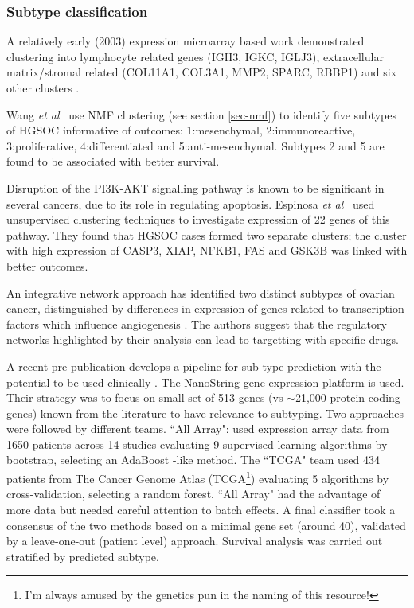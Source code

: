 \documentclass[tikz, 11pt,a4paper,oneside,fleqn]{article}
\newcommand{\etal}{{\em et al\/}}
\begin{document}
\subsubsection{Subtype classification}
\label{sec-subtype-classification}

A relatively early (2003) expression microarray based work demonstrated clustering into lymphocyte related genes (IGH3, IGKC, IGLJ3), extracellular matrix/stromal related (COL11A1, COL3A1, MMP2, SPARC, RBBP1) and six other clusters \cite{Schaner2003}.

Wang \etal\ \cite{Wang2017c} use NMF clustering (see section \ref{sec-nmf}) to identify five subtypes of HGSOC informative of outcomes: 1:mesenchymal, 2:immunoreactive, 3:proliferative, 4:differentiated and 5:anti-mesenchymal.
Subtypes 2 and 5 are found to be associated with better survival.

Disruption of the PI3K-AKT signalling pathway is known to be significant in several cancers, due to its role in regulating apoptosis.  
Espinosa \etal\ \cite{Espinosa2011} used unsupervised clustering techniques to investigate expression of 22 genes of this pathway.  
They found that HGSOC cases formed two separate clusters; the cluster with high expression of CASP3, XIAP, NFKB1, FAS and GSK3B was linked with better outcomes.

An integrative network approach has identified two distinct subtypes of ovarian cancer, distinguished by differences in expression of genes related to transcription factors which influence angiogenesis \cite{Glass2015}.  The authors suggest that the regulatory networks highlighted by their analysis can lead to targetting with specific drugs.

A recent pre-publication develops a pipeline for sub-type prediction with the potential to be used clinically \cite{Talhouk2020}.
The NanoString gene expression platform is used.  Their strategy was to focus on small set of 513 genes (vs $\sim$21,000 protein coding genes) known from the literature to have relevance to subtyping.
Two approaches were followed by different teams.  ``All Array": used expression array data from 1650 patients across 14 studies evaluating 9 supervised learning algorithms by bootstrap, selecting an AdaBoost -like method. The ``TCGA" team used 434 patients from The Cancer Genome Atlas (TCGA\footnote{I'm always amused by the genetics pun in the naming of this resource!}) evaluating 5 algorithms by cross-validation, selecting a random forest.  ``All Array" had the advantage of more data but needed careful attention to batch effects. A final classifier took a consensus of the two methods based on a minimal gene set (around 40), validated by a leave-one-out (patient level) approach.  Survival analysis was carried out stratified by predicted subtype.
\end{document}

